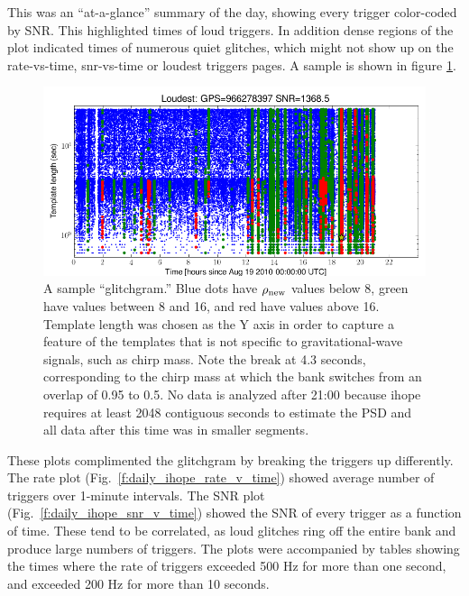 
This was an ``at-a-glance'' summary of the day, showing every trigger
color-coded by SNR.  This highlighted times of loud triggers.  In
addition dense regions of the plot indicated times of numerous quiet
glitches, which might not show up on the rate-vs-time, snr-vs-time or
loudest triggers pages.  A sample is shown in
figure \ref{f:daily_ihope_glitchgram}.

\begin{figure}
  \includegraphics[width=\linewidth]{figures/detchar/H1_1_UNCLUSTERED_glitchgram.png}
  \caption[The Aug 19th daily ihope ``glitchgram'']{
  \label{f:daily_ihope_glitchgram}
A sample ``glitchgram.'' Blue dots have
$\rho_{\textrm{new}}$ values below 8, green have values between 8 and 16,
and red have values above 16.  Template length was chosen as the Y
axis in order to capture a feature of the templates that is not
specific to gravitational-wave signals, such as chirp mass.
Note the break at 4.3 seconds, corresponding to the
chirp mass at which the bank switches from an overlap of 0.95 to 0.5.
No data is analyzed after 21:00
because ihope requires at least 2048 contiguous seconds to estimate
the PSD and all data after this time was in smaller segments.}
\end{figure}%



These plots complimented the glitchgram by breaking the triggers up
differently.  The rate plot (Fig.~\ref{f:daily_ihope_rate_v_time})
showed average number of triggers over 1-minute intervals.  The SNR
plot (Fig.~\ref{f:daily_ihope_snr_v_time}) showed the SNR of every
trigger as a function of time.  These tend to be correlated, as loud
glitches ring off the entire bank and produce large numbers of
triggers.  The plots were accompanied by tables showing the times
where the rate of triggers exceeded 500 Hz for more than one second,
and exceeded 200 Hz for more than 10 seconds.

